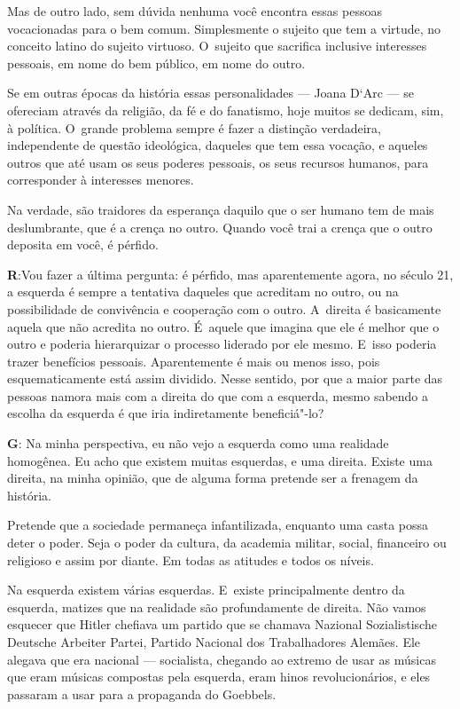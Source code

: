  

Mas de outro lado, sem dúvida nenhuma você encontra essas pessoas
vocacionadas para o bem comum. Simplesmente o sujeito que tem a
virtude, no conceito latino do sujeito virtuoso. O~sujeito que
sacrifica inclusive interesses pessoais, em nome do bem público, em nome
do outro.

 

Se em outras épocas da história essas personalidades --- Joana D`Arc ---
se ofereciam através da religião, da fé e do fanatismo, hoje
muitos se dedicam, sim, à política. O~grande problema sempre é fazer a
distinção verdadeira, independente de questão ideológica, daqueles que
tem essa vocação, e aqueles outros que até usam os seus poderes
pessoais, os seus recursos humanos, para corresponder à interesses
menores.

 

Na verdade, são traidores da esperança daquilo que o ser humano tem de
mais deslumbrante, que é a crença no outro. Quando você trai a crença
que o outro deposita em você, é pérfido.

 

\textbf{R}:Vou fazer a última pergunta: é pérfido, mas aparentemente
agora, no século 21, a esquerda é sempre a tentativa daqueles que
acreditam no outro, ou na possibilidade de convivência e cooperação com
o outro. A~direita é basicamente aquela que não acredita no outro. É~aquele que imagina que ele é melhor que o outro e poderia hierarquizar o
processo liderado por ele mesmo. E~isso poderia trazer benefícios
pessoais. Aparentemente é mais ou menos isso, pois esquematicamente está
assim dividido. Nesse sentido, por que a maior parte das pessoas namora
mais com a direita do que com a esquerda, mesmo sabendo a escolha da
esquerda é que iria indiretamente beneficiá"-lo?

 

\textbf{G}: Na minha perspectiva, eu não vejo a esquerda como uma
realidade homogênea. Eu acho que existem muitas esquerdas, e uma
direita. Existe uma direita, na minha opinião, que de alguma forma
pretende ser a frenagem da história.

 

Pretende que a sociedade permaneça infantilizada, enquanto uma casta
possa deter o poder. Seja o poder da cultura, da academia militar,
social, financeiro ou religioso e assim por diante. Em todas as atitudes
e todos os níveis.

 

Na esquerda existem várias esquerdas. E~existe principalmente dentro da
esquerda, matizes que na realidade são profundamente de direita. Não
vamos esquecer que Hitler chefiava um partido que se chamava Nazional
Sozialistische Deutsche Arbeiter Partei, Partido Nacional dos
Trabalhadores Alemães. Ele alegava que era nacional --- socialista,
chegando ao extremo de usar as músicas que eram músicas compostas pela
esquerda, eram hinos revolucionários, e eles passaram a usar para a
propaganda do Goebbels. 

